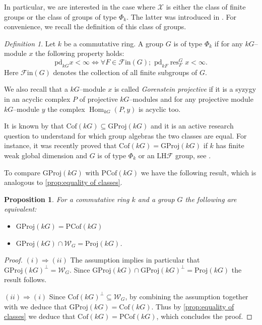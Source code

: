 \documentclass{amsart}
\newcommand{\res}{\operatorname{res}\nolimits}
\newcommand{\Hom}{\operatorname{Hom}\nolimits}
\def \Fin{{\mathcal{F}\textrm{in}}}
\def \Wfin{{\mathcal W}_{G}}
\numberwithin{equation}{section}%
\newtheorem{proposition}[equation]{Proposition}
\theoremstyle{remark}
\newtheorem{definition}[equation]{Definition}
\begin{document}
{In particular, we are interested in the case where $\mathcal{X}$ is either the class of finite groups or the class of groups of type $\Phi_k$. The latter was introduced in \cite{Tal}. For convenience, we recall the definition of this class of groups. 

\begin{definition}
\label{def:phi}
    Let $k$ be a commutative ring. A group $G$ is of type $\Phi_k$ if for any $kG$--module $x$ the following property holds: 
    \[
    \mathrm{pd}_{kG}x<\infty \iff \forall F\in \Fin(G);\,\, \mathrm{pd}_{kF}\res^G_F x  <\infty. 
    \]
Here $\Fin(G)$ denotes the collection of all finite subgroups of $G$.
\end{definition}

We also recall that a $kG$--module $x$ is called \textit{Gorenstein projective} if it is a syzygy in an acyclic complex $P$ of projective $kG$--modules and for any projective module $kG$--module $y$ the complex $\Hom_{kG}(P,y)$ is acyclic too. 

It is known by \cite{CP} that $\mathrm{Cof}(kG)\subseteq \mathrm{GProj}(kG)$ and it is an active research question to understand for which group algebras the two classes are equal.  For instance, it was recently proved that  $\mathrm{Cof}(kG)=\mathrm{GProj}(kG)$ if $k$ has finite weak global dimension and $G$ is of type $\Phi_k$ or an $\mathrm{LH}\mathcal{F}$ group, see \cite[Corollary 2.5]{ET_cof}. 

To compare $\mathrm{GProj}(kG)$ with $\mathrm{PCof}(kG)$ we have the following result, which is analogous to \cref{prop:equality of classes}.

\begin{proposition}
\label{prop:equality of G-classes}
For a commutative ring $k$ and a group $G$ the following are equivalent:
\begin{itemize}
\item[(i)] $\mathrm{GProj}(kG)=\mathrm{PCof}(kG)$
\item[(ii)] $\mathrm{GProj}(kG)\cap\Wfin = \mathrm{Proj}(kG)$.
\end{itemize}
\end{proposition}

\begin{proof}
$(i)\Rightarrow(ii)$ The assumption implies in particular that $\mathrm{GProj}(kG)^{\bot}=\mathcal{W}_G$. Since $\mathrm{GProj}(kG)\cap \mathrm{GProj}(kG)^{\bot}=\mathrm{Proj}(kG)$ the result follows.

$(ii)\Rightarrow(i)$ Since $\mathrm{Cof}(kG)^{\perp}\subseteq \Wfin$, by combining the assumption together with \cite[Proposition 4.3]{ET_cof} we deduce  that $\mathrm{GProj}(kG)=\mathrm{Cof}(kG)$. Thus by \cref{prop:equality of classes} we deduce that $\mathrm{Cof}(kG)=\mathrm{PCof}(kG)$, which concludes the proof.
\end{proof}

}
\end{document}

